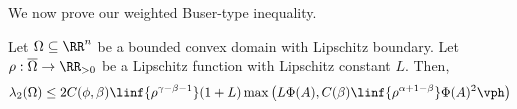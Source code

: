We now prove our weighted Buser-type inequality.

\begin{theorem} \label{thm:Abuser_n}
  Let $\Omega\subseteq\RR^n$ be a
  bounded convex domain with Lipschitz boundary. Let
  $\rho:\overline{\Omega}\to\RR_{>0}$ be a Lipschitz function with
  Lipschitz constant $L$. Then,
\begin{align*}
\lambda_2(\Omega) \leq 2 C(\phi,\beta)\linf{\rho^{\gamma-\beta-1}}(1+L) 
  \max\left(L \Phi(A), C(\beta)\linf{\rho^{\alpha+1-\beta}} \Phi(A)^2 \vph\right)
\end{align*}
\end{theorem}





